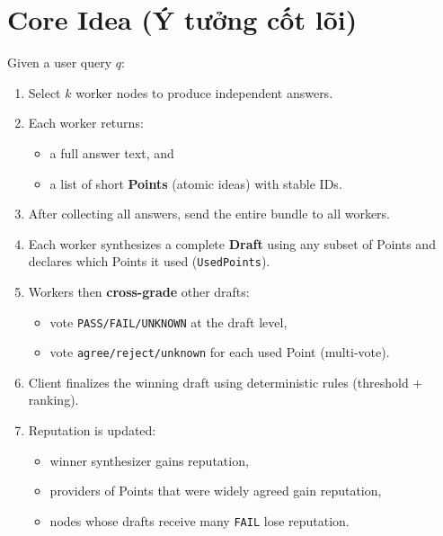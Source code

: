 \documentclass[11pt]{article}
\begin{document}
\section{Core Idea (Ý tưởng cốt lõi)}
Given a user query \(q\):
\begin{enumerate}[leftmargin=1.2em]
  \item Select \(k\) worker nodes to produce independent answers.
  \item Each worker returns:
  \begin{itemize}[leftmargin=1.2em]
    \item a full answer text, and
    \item a list of short \textbf{Points} (atomic ideas) with stable IDs.
  \end{itemize}
  \item After collecting all answers, send the entire bundle to all workers.
  \item Each worker synthesizes a complete \textbf{Draft} using any subset of Points and declares which Points it used (\texttt{UsedPoints}).
  \item Workers then \textbf{cross-grade} other drafts:
  \begin{itemize}[leftmargin=1.2em]
    \item vote \texttt{PASS/FAIL/UNKNOWN} at the draft level,
    \item vote \texttt{agree/reject/unknown} for each used Point (multi-vote).
  \end{itemize}
  \item Client finalizes the winning draft using deterministic rules (threshold + ranking).
  \item Reputation is updated:
  \begin{itemize}[leftmargin=1.2em]
    \item winner synthesizer gains reputation,
    \item providers of Points that were widely agreed gain reputation,
    \item nodes whose drafts receive many \texttt{FAIL} lose reputation.
  \end{itemize}
\end{enumerate}
\end{document}
